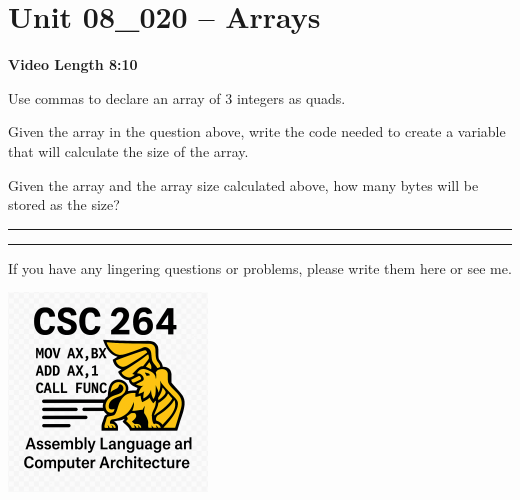 \documentclass[letterpaper,12pt]{exam}
\newcommand{\unit}{Unit 08}
\begin{document}
\begin{questions}
\begin{samepage}
\begin{verbatim}
    \end{verbatim}
    \vspace{5mm}
\end{samepage}
\par
   \section*{\unit\_020 -- Arrays}
   \par{\selectfont\textbf{Video Length 8:10}}
   \begin{samepage}
       \question Use commas to declare an array of 3 integers as quads.  
       \vspace{5mm}  
   \end{samepage}
   \par
   \begin{samepage}
       \question Given the array in the question above, write the code needed to create a variable that will calculate the size of the array.
       \vspace{5mm}
   \end{samepage}
   \par
\begin{samepage}
    \question Given the array and the array size calculated above, how many bytes will be stored as the size?
    \vspace{5mm}
\end{samepage}
\par
 
   \rule{0.5\textwidth}{.4pt} %
 










\end{questions} 
\begin{center}
    \rule{0.667\textwidth}{.8pt} %
\end{center}


If you have any lingering questions or problems, please write them here or see me.
\vfill
\begin{center}
\includegraphics{../csc264Logo}
\end{center}
\end{document}
